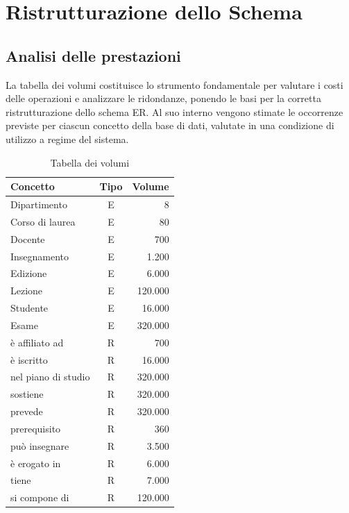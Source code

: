 \section{Ristrutturazione dello Schema}

\subsection{Analisi delle prestazioni}

La tabella dei volumi costituisce lo strumento fondamentale per valutare i costi delle operazioni e analizzare le ridondanze, ponendo le basi per la corretta ristrutturazione dello schema ER. 
Al suo interno vengono stimate le occorrenze previste per ciascun concetto della base di dati, valutate in una condizione di utilizzo a regime del sistema.

\begin{table}[h]
    \centering
    \renewcommand{\arraystretch}{1.2}
    \begin{tabular}{|l|c|r|}
        \hline
        \textbf{Concetto} & \textbf{Tipo} & \textbf{Volume} \\
        \hline
        Dipartimento & E & 8 \\
        \hline
        Corso di laurea & E & 80 \\
        \hline
        Docente & E & 700 \\
        \hline
        Insegnamento & E & 1.200 \\
        \hline
        Edizione & E & 6.000 \\
        \hline
        Lezione & E & 120.000 \\
        \hline
        Studente & E & 16.000 \\
        \hline
        Esame & E & 320.000 \\
        \hline
        è affiliato ad & R & 700 \\
        \hline
        è iscritto & R & 16.000 \\
        \hline
        nel piano di studio & R & 320.000 \\
        \hline
        sostiene & R & 320.000 \\
        \hline
        prevede & R & 320.000 \\
        \hline
        prerequisito & R & 360 \\
        \hline
        può insegnare & R & 3.500 \\
        \hline
        è erogato in & R & 6.000 \\
        \hline
        tiene & R & 7.000 \\
        \hline
        si compone di & R & 120.000 \\
        \hline
    \end{tabular}
    \caption{Tabella dei volumi}
    \label{tab:volumi}
\end{table}

